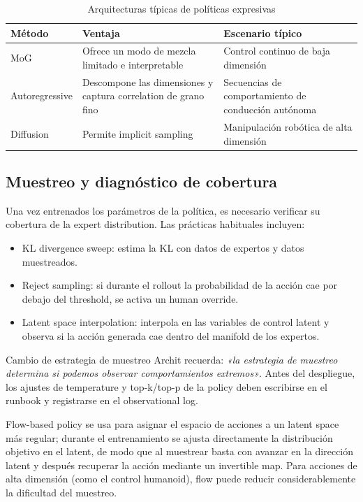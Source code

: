 \begin{table}[H]
\centering
\begin{tabular}{p{} p{} p{}}
\toprule
Método & Ventaja & Escenario típico \\
\midrule
MoG & Ofrece un modo de mezcla limitado e interpretable & Control continuo de baja dimensión \\
Autoregressive & Descompone las dimensiones y captura correlation de grano fino & Secuencias de comportamiento de conducción autónoma \\
Diffusion & Permite implicit sampling & Manipulación robótica de alta dimensión \\
\bottomrule
\end{tabular}
\caption{Arquitecturas típicas de políticas expresivas}
\end{table}

\subsection{Muestreo y diagnóstico de cobertura}

Una vez entrenados los parámetros de la política, es necesario verificar su cobertura de la expert distribution. Las prácticas habituales incluyen:
\begin{itemize}
    \item KL divergence sweep: estima la KL con datos de expertos y datos muestreados.
    \item Reject sampling: si durante el rollout la probabilidad de la acción cae por debajo del threshold, se activa un human override.
    \item Latent space interpolation: interpola en las variables de control latent y observa si la acción generada cae dentro del manifold de los expertos.
\end{itemize}

\begin{knowledgebox}{Cambio de estrategia de muestreo}
Archit recuerda: \textit{«la estrategia de muestreo determina si podemos observar comportamientos extremos»}. Antes del despliegue, los ajustes de temperature y top-k/top-p de la policy deben escribirse en el runbook y registrarse en el observational log.
\end{knowledgebox}

Flow-based policy se usa para asignar el espacio de acciones a un latent space más regular; durante el entrenamiento se ajusta directamente la distribución objetivo en el latent, de modo que al muestrear basta con avanzar en la dirección latent y después recuperar la acción mediante un invertible map. Para acciones de alta dimensión (como el control humanoid), flow puede reducir considerablemente la dificultad del muestreo.

